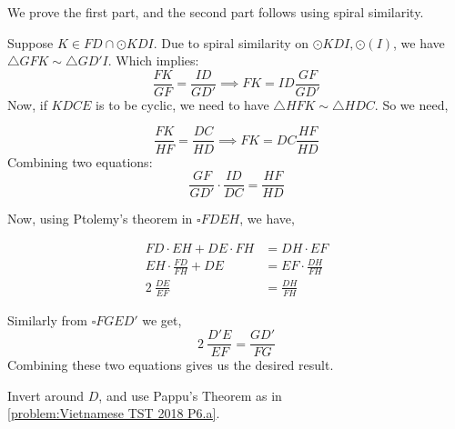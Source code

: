 \begin{solution} 
    \label{problem:vietTST2018P6.a}


    We prove the first part, and the second part follows using spiral
    similarity.

    Suppose $ K\in FD\cap \odot KDI $. Due to spiral similarity on $ \odot
    KDI, \odot (I) $, we have $ \triangle GFK \sim \triangle GD'I $. Which
    implies: \[\frac{FK}{GF}=\frac{ID}{GD'} \implies FK = ID\frac{GF}{GD'}\]
    Now, if $ KDCE $ is to be cyclic, we need to have $ \triangle HFK \sim
    \triangle HDC $. So we need, 

    \[\frac{FK}{HF}=\frac{DC}{HD}\implies FK=DC\frac{HF}{HD}\] 
    Combining two equations: 
    \[\frac{GF}{GD'}\cdot \frac{ID}{DC}=\frac{HF}{HD}\]

    Now, using Ptolemy's theorem in $ \square FDEH $, we have, 

    \begin{align*}
        FD\cdot EH + DE\cdot FH &= DH\cdot EF\\ 
        EH \cdot \frac{FD}{FH} + DE &= EF \cdot\frac{DH}{FH}\\ 
        2\ \frac{DE}{EF} &= \frac{DH}{FH} 
    \end{align*} 

    Similarly from $ \square FGED' $ we get, \[2\ \frac{D'E}{EF} =
    \frac{GD'}{FG}\] Combining these two equations gives us the desired result.  
\end{solution}


\begin{minipage}{.45\linewidth}

    \begin{solution}[Inversion] 
        Invert around $ D $, and use Pappu's Theorem as in\\
        \autoref{problem:Vietnamese TST 2018 P6.a}.  
    \end{solution} 
\end{minipage}\hfill%
\begin{minipage}{.52\linewidth}
\end{minipage}


